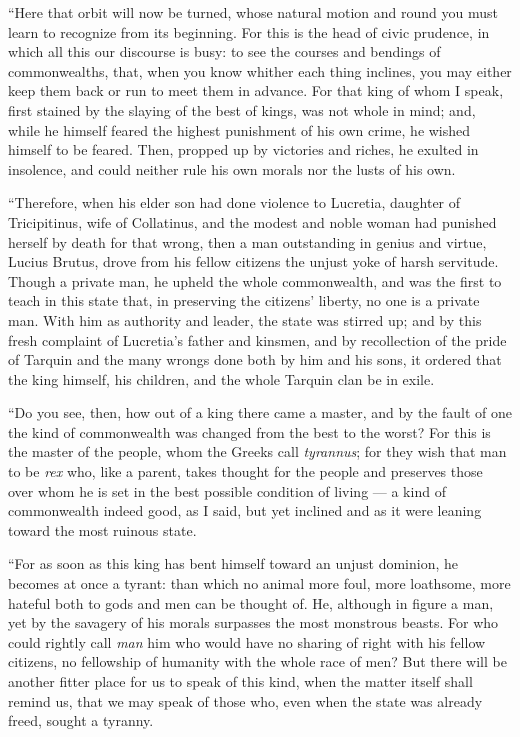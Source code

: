  ``Here that orbit will now be turned, whose natural motion and round you must learn to recognize from its beginning. For this is the head of civic prudence, in which all this our discourse is busy: to see the courses and bendings of commonwealths, that, when you know whither each thing inclines, you may either keep them back or run to meet them in advance. For that king of whom I speak, first stained by the slaying of the best of kings, was not whole in mind; and, while he himself feared the highest punishment of his own crime, he wished himself to be feared. Then, propped up by victories and riches, he exulted in insolence, and could neither rule his own morals nor the lusts of his own.

 ``Therefore, when his elder son had done violence to Lucretia, daughter of Tricipitinus, wife of Collatinus, and the modest and noble woman had punished herself by death for that wrong, then a man outstanding in genius and virtue, Lucius Brutus, drove from his fellow citizens the unjust yoke of harsh servitude. Though a private man, he upheld the whole commonwealth, and was the first to teach in this state that, in preserving the citizens' liberty, no one is a private man. With him as authority and leader, the state was stirred up; and by this fresh complaint of Lucretia's father and kinsmen, and by recollection of the pride of Tarquin and the many wrongs done both by him and his sons, it ordered that the king himself, his children, and the whole Tarquin clan be in exile.

 ``Do you see, then, how out of a king there came a master, and by the fault of one the kind of commonwealth was changed from the best to the worst? For this is the master of the people, whom the Greeks call \textit{tyrannus}; for they wish that man to be \textit{rex} who, like a parent, takes thought for the people and preserves those over whom he is set in the best possible condition of living --- a kind of commonwealth indeed good, as I said, but yet inclined and as it were leaning toward the most ruinous state.

 ``For as soon as this king has bent himself toward an unjust dominion, he becomes at once a tyrant: than which no animal more foul, more loathsome, more hateful both to gods and men can be thought of. He, although in figure a man, yet by the savagery of his morals surpasses the most monstrous beasts. For who could rightly call \textit{man} him who would have no sharing of right with his fellow citizens, no fellowship of humanity with the whole race of men? But there will be another fitter place for us to speak of this kind, when the matter itself shall remind us, that we may speak of those who, even when the state was already freed, sought a tyranny.

